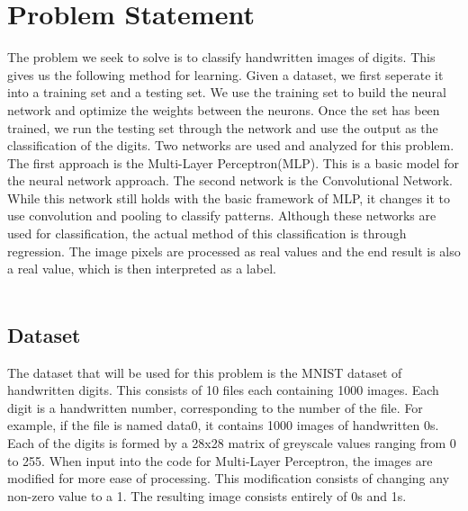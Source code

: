 \documentclass[paper=a4, fontsize=11pt]{scrartcl} %
\numberwithin{equation}{section} %
\numberwithin{figure}{section} %
\numberwithin{table}{section} %
\begin{document}
	\section{Problem Statement}
	The problem we seek to solve is to classify handwritten images of digits. This gives us the following method for learning. Given a dataset, we first seperate it into a training set and a testing set. We use the training set to build the neural network and optimize the weights between the neurons. Once the set has been trained, we run the testing set through the network and use the output as the classification of the digits. Two networks are used and analyzed for this problem. The first approach is the Multi-Layer Perceptron(MLP). This is a basic model for the neural network approach. The second network is the Convolutional Network. While this network still holds with the basic framework of MLP, it changes it to use convolution and pooling to classify patterns. Although these networks are used for classification, the actual method of this classification is through regression. The image pixels are processed as real values and the end result is also a real value, which is then interpreted as a label.
	\\\\
	\subsection{Dataset}
	The dataset that will be used for this problem is the MNIST dataset of handwritten digits. This consists of 10 files each containing 1000 images. Each digit is a handwritten number, corresponding to the number of the file. For example, if the file is named data0, it contains 1000 images of handwritten 0s. Each of the digits is formed by a 28x28 matrix of greyscale values ranging from 0 to 255. When input into the code for Multi-Layer Perceptron, the images are modified for more ease of processing. This modification consists of changing any non-zero value to a 1. The resulting image consists entirely of 0s and 1s.  
	\\\\
\end{document}
